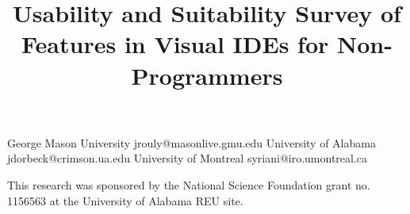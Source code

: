 \documentclass[10pt,preprint]{styles/sigplanconf}
\begin{document}
\setlength{\pdfpageheight}{\paperheight}
\setlength{\pdfpagewidth}{\paperwidth}






\title{Usability and Suitability Survey of Features in Visual IDEs for Non-Programmers}

           {George Mason University}
           {jrouly@masonlive.gmu.edu}
           {University of Alabama}
           {jdorbeck@crimson.ua.edu}
           {University of Montreal}
           {syriani@iro.umontreal.ca}

\maketitle
















\acks

This research was sponsored by the National Science Foundation grant no. 1156563 at the University of Alabama REU site.



\end{document}
